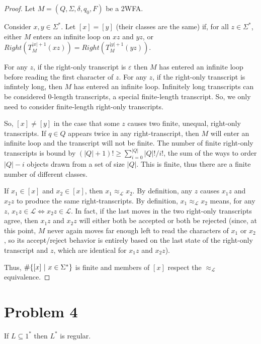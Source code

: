 \documentclass[11pt]{article}
\begin{document}
\begin{proof}
Let $M = (Q, \Sigma, \delta, q_0, F)$ be a 2WFA.

Consider $x,y \in \Sigma^*$.  Let $[x] = [y]$ (their classes are the same) if, for all $z \in \Sigma^*$, either $M$ enters an infinite loop on $xz$ and $yz$, or $Right(T_M^{|x|+1}(xz)) = Right(T_M^{|y|+1}(yz))$.

For any $z$, if the right-only transcript is $\varepsilon$ then $M$ has entered an infinite loop before reading the first character of $z$. For any $z$, if the right-only transcript is infintely long, then $M$ has entered an infinite loop. Infinitely long transcripts can be considered 0-length transcripts, a special finite-length transcript. So, we only need to consider finite-length right-only transcripts.

So, $[x] \neq [y]$ in the case that some $z$ causes two finite, unequal, right-only transcripts. If $q \in Q$ appears twice in any right-transcript, then $M$ will enter an infinite loop and the transcript will not be finite. The number of finite right-only transcripts is bound by $(|Q|+1)! \geq \sum_{i=0}^{|Q|}{ |Q|! / i! }$, the sum of the ways to order $|Q|-i$ objects drawn from a set of size $|Q|$. This is finite, thus there are a finite number of different classes.

If $x_1 \in [x]$ and $x_2 \in [x]$, then $x_1 \approx_\mathcal{L} x_2$. By definition, any $z$ causes $x_1z$ and $x_2z$ to produce the same right-transcripts. By definition, $x_1 \approx_\mathcal{L} x_2$ means, for any $z$, $x_1z \in \mathcal{L} \iff x_2z \in \mathcal{L}$. In fact, if the last moves in the two right-only transcripts agree, then $x_1z$ and $x_2z$ will either both be accepted or both be rejected (since, at this point, $M$ never again moves far enough left to read the characters of $x_1$ or $x_2$, so its accept/reject behavior is entirely based on the last state of the right-only transcript and $z$, which are identical for $x_1z$ and $x_2z$). 

Thus, $\#\{ [x] \ | \  x \in \Sigma^* \}$ is finite and members of $[x]$ respect the $\approx_\mathcal{L}$ equivalence.
\end{proof}

\pagebreak
\section*{Problem 4}
If $L \subseteq 1^*$ then $L^*$ is regular.
\end{document}
